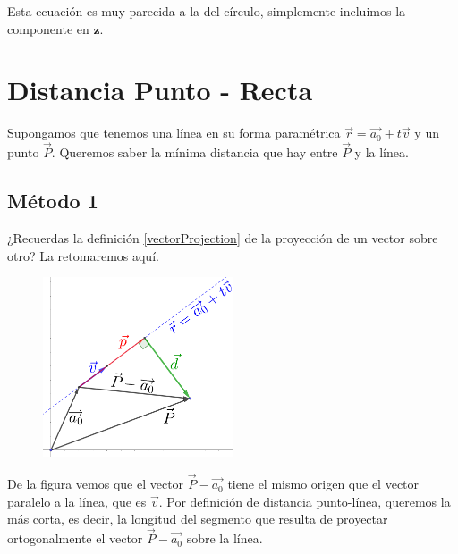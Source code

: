 \documentclass[12pt, fleqn]{report}                             %
\theoremstyle{break}                                            %
\newcommand{\lVec}[1]{\overrightarrow{#1}}                      %
\begin{document}
            Esta ecuación es muy parecida a la del círculo, simplemente incluimos
            la componente en $\mathbf{z}$.
            


        \clearpage    
        \section{Distancia Punto - Recta}
        
            Supongamos que tenemos una línea en su forma paramétrica $\vec{r} = \lVec{a_0} + t\vec{v}$
            y un punto $\vec{P}$. Queremos saber la mínima distancia que hay entre $\vec{P}$ y la línea.
        

            \subsection{Método 1}
                
                ¿Recuerdas la definición \ref{vectorProjection} de la proyección de un vector sobre otro?
                La retomaremos aquí.
                
                \begin{figure}[H]
                    \centering
                    \includegraphics[width=0.5\textwidth]{distancePointLine}
                \end{figure}
            
                De la figura vemos que el vector $\vec{P} - \lVec{a_0}$ tiene el mismo origen que el
                vector paralelo a la línea, que es $\vec{v}$. Por definición de distancia punto-línea,
                queremos la más corta, es decir, la longitud del segmento que resulta de proyectar
                ortogonalmente el vector $\vec{P} - \lVec{a_0}$ sobre la línea.
                
\end{document}
